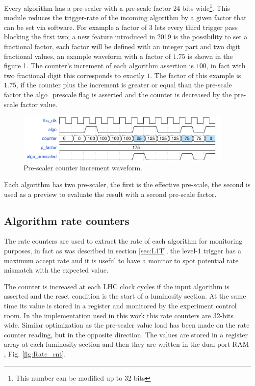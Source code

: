 \documentclass[../../main.tex]{subfiles}
\begin{document}
Every algorithm has a pre-scaler with a pre-scale factor 24 bits wide\footnote{This number can be modified up to 32 bits}. This module reduces the trigger-rate of the incoming algorithm by a given factor that can be set via software. For example a factor of 3 lets every third trigger pass blocking the first two; a new feature introduced in 2019 is the possibility to set a fractional factor, each factor will be defined with an integer part and two digit fractional values, an example waveform with a factor of $1.75$ is shown in the figure \ref{fig:prescaler}. The counter's increment of each algorithm assertion is $100$, in fact with two fractional digit this corresponds to exactly $1$. The factor of this example is $1.75$, if the counter plus the increment is greater or equal than the pre-scale factor the algo\_prescale flag is asserted and the counter is decreased by the pre-scale factor value.


\begin{figure}[h]
    \centering
    \includegraphics[width=0.95\textwidth]{sections/06/Images/Prescaler_wf.pdf}
    \caption{Pre-scaler counter increment waveform.}
    \label{fig:prescaler}
\end{figure}

Each algorithm has two pre-scaler, the first is the effective pre-scale, the second is used as a preview to evaluate the result with a second pre-scale factor.

\subsection{Algorithm rate counters}
\label{sec:Finor_ratecnt}

The rate counters are used to extract the rate of each algorithm for monitoring purposes, in fact as was described in section \ref{sec:L1T}, the level-1 trigger has a maximum accept rate and it is useful to have a monitor to spot potential rate mismatch with the expected value. 

The counter is increased at each LHC clock cycles if the input algorithm is asserted and  the reset condition is the start of a luminosity section. At the same time its value is stored in a register and monitored by the experiment control room. In the implementation used in this work this rate counters are 32-bits wide.
Similar optimization as the pre-scaler value load has been made on the rate counter reading, but in the opposite direction. The values are stored in a register array at each luminosity section and then they are written in the dual port RAM , Fig. \ref{fig:Rate_cnt}.
\end{document}
